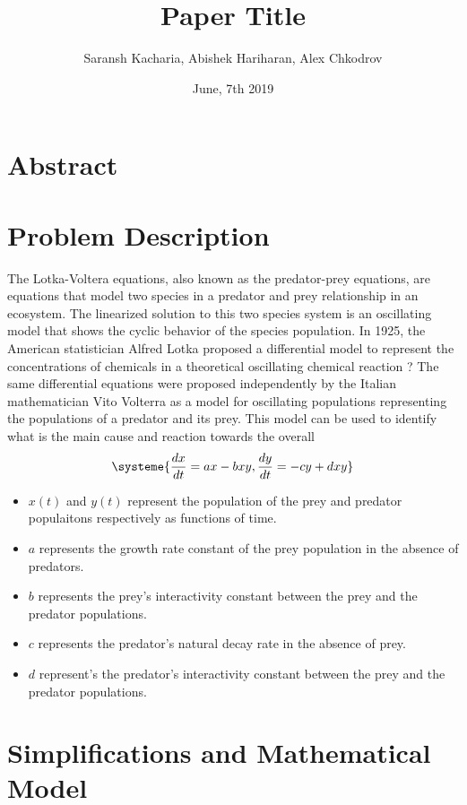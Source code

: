 \documentclass[11pt,oneside]{article}
\title{Paper Title}
\author{Saransh Kacharia, Abishek Hariharan, Alex Chkodrov}
\date{June, 7th 2019}
\begin{document}
	\maketitle
	\pagestyle{fancy}
	\section{Abstract}
	\section{Problem Description}
	The Lotka-Voltera equations, also known as the predator-prey equations, are equations that model two species in a predator and prey relationship in an ecosystem. The linearized solution to this two species system is an oscillating model that shows the cyclic behavior of the species population. In 1925, the American statistician Alfred Lotka proposed a differential model to represent the concentrations of chemicals in a theoretical oscillating chemical reaction ? The same differential equations were proposed independently by the Italian mathematician Vito Volterra as a model for oscillating populations representing the populations of a predator and its prey. This model can be used to identify what is the main cause and reaction towards the overall
	\begin{equation}
	\systeme{
		\frac{dx}{dt} = ax - bxy,
		\frac{dy}{dt} = -cy + dxy
	}
	\end{equation}
	\begin{itemize}
		\item $x(t)$ and $y(t)$ represent the population of the prey and predator populaitons respectively as functions of time.
		\item $a$ represents the growth rate constant of the prey population in the absence of predators.
		\item $b$ represents the prey's interactivity constant between the prey and the predator populations.
		\item $c$ represents the predator's natural decay rate in the absence of prey.
		\item $d$ represent's the predator's interactivity constant between the prey and the predator populations.
	\end{itemize}
	
	
	\section{Simplifications and Mathematical Model}
	
\end{document}
